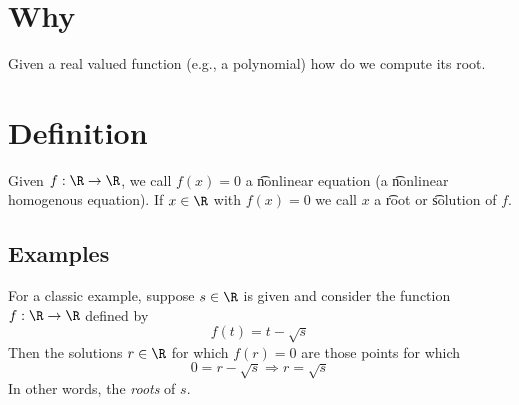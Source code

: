 
\section*{Why}

Given a real valued function (e.g., a polynomial) how do we compute its root.

\section*{Definition}

Given $f: \R  \to \R $, we call $f(x) = 0$ a \t{nonlinear equation} (a \t{nonlinear homogenous equation}).
If $x \in \R $ with $f(x) = 0$ we call $x$ a \t{root} or \t{solution} of $f$.

\subsection*{Examples}

For a classic example, suppose $s \in \R $ is given and consider the function $f: \R  \to \R $ defined by
\[
f(t) = t - \sqrt{s}
\]
Then the solutions $r \in \R $ for which $f(r) = 0$ are those points for which
\[
0 = r - \sqrt{s} \Rightarrow r = \sqrt{s}
\]
In other words, the \textit{roots} of $s$.

\blankpage